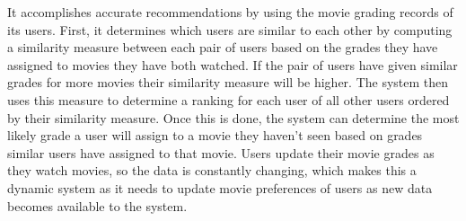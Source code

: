 It accomplishes accurate recommendations by using the movie grading records of its users.  First, it determines which users are similar to each other by computing a similarity measure between each pair of users based on the grades they have assigned to movies they have both watched.  If the pair of users have given similar grades for more movies their similarity measure will be higher.  The system then uses this measure to determine a ranking for each user of all other users ordered by their similarity measure.  Once this is done, the system can determine the most likely grade a user will assign to a movie they haven't seen based on grades similar users have assigned to that movie.  Users update their movie grades as they watch movies, so the data is constantly changing, which makes this a dynamic system as it needs to update movie preferences of users as new data becomes available to the system.